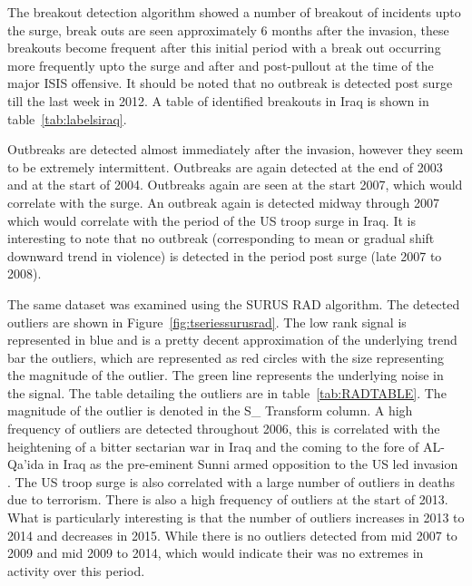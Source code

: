 The breakout detection algorithm showed a number of  breakout of incidents upto the surge, break outs are seen approximately 6 months after the invasion, these breakouts become frequent after this initial period with a break out occurring more frequently upto the surge and after and post-pullout at the time of the major ISIS offensive. It should be noted that no outbreak is detected post surge till the last week in 2012. A table of identified breakouts in Iraq is shown in table~\ref{tab:labelsiraq}. 

Outbreaks are detected almost immediately after the invasion, however they seem to be extremely intermittent. Outbreaks are again detected at the end of 2003 and at the start of 2004. Outbreaks again are seen at the start 2007, which would correlate with the surge. An outbreak again is detected midway through 2007 which would correlate with the period of the US troop surge in Iraq. It is interesting to note that no outbreak (corresponding to mean or gradual shift downward trend in violence) is detected in the period post surge (late 2007 to 2008). 

The same dataset was examined using the SURUS RAD algorithm. The detected outliers are shown in Figure~\ref{fig:tseriessurusrad}. The low rank signal is represented in blue and is a pretty decent approximation of the underlying trend bar the outliers, which are represented as red circles with the size representing the magnitude of the outlier. The green line represents the underlying noise in the signal. The table detailing the outliers are in table~\ref{tab:RADTABLE}. The magnitude of the outlier is denoted in the S\_ Transform column. A high frequency of outliers are detected throughout 2006, this is correlated with the heightening of a bitter sectarian war in Iraq and the coming to the fore of AL-Qa'ida in Iraq as the pre-eminent Sunni armed opposition to the US led invasion \citep{fearon2007iraq}. The US troop surge \citep{ricks2009gamble} is also correlated with a large number of outliers in deaths due to terrorism. There is also a high frequency of outliers at the start of 2013. What is particularly interesting is that the number of  outliers increases in 2013 to 2014 and decreases in 2015.  While there is no outliers detected from mid 2007 to 2009 and mid 2009 to 2014, which would indicate their was no extremes in activity over this period.


